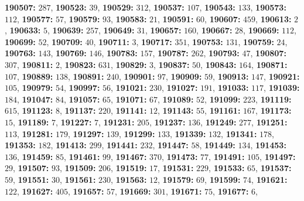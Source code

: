 \textsf{\bfseries 190507:} $287$, \textsf{\bfseries 190523:} $39$, \textsf{\bfseries 190529:} $312$, \textsf{\bfseries 190537:} $107$, \textsf{\bfseries 190543:} $133$, \textsf{\bfseries 190573:} $112$, \textsf{\bfseries 190577:} $57$, \textsf{\bfseries 190579:} $93$, \textsf{\bfseries 190583:} $21$, \textsf{\bfseries 190591:} $60$, \textsf{\bfseries 190607:} $459$, \textsf{\bfseries 190613:} $2$, \textsf{\bfseries 190633:} $5$, \textsf{\bfseries 190639:} $257$, \textsf{\bfseries 190649:} $31$, \textsf{\bfseries 190657:} $160$, \textsf{\bfseries 190667:} $28$, \textsf{\bfseries 190669:} $112$, \textsf{\bfseries 190699:} $52$, \textsf{\bfseries 190709:} $40$, \textsf{\bfseries 190711:} $3$, \textsf{\bfseries 190717:} $351$, \textsf{\bfseries 190753:} $131$, \textsf{\bfseries 190759:} $24$, \textsf{\bfseries 190763:} $143$, \textsf{\bfseries 190769:} $146$, \textsf{\bfseries 190783:} $157$, \textsf{\bfseries 190787:} $262$, \textsf{\bfseries 190793:} $47$, \textsf{\bfseries 190807:} $307$, \textsf{\bfseries 190811:} $2$, \textsf{\bfseries 190823:} $631$, \textsf{\bfseries 190829:} $3$, \textsf{\bfseries 190837:} $50$, \textsf{\bfseries 190843:} $164$, \textsf{\bfseries 190871:} $107$, \textsf{\bfseries 190889:} $138$, \textsf{\bfseries 190891:} $240$, \textsf{\bfseries 190901:} $97$, \textsf{\bfseries 190909:} $59$, \textsf{\bfseries 190913:} $147$, \textsf{\bfseries 190921:} $105$, \textsf{\bfseries 190979:} $54$, \textsf{\bfseries 190997:} $56$, \textsf{\bfseries 191021:} $230$, \textsf{\bfseries 191027:} $191$, \textsf{\bfseries 191033:} $117$, \textsf{\bfseries 191039:} $184$, \textsf{\bfseries 191047:} $84$, \textsf{\bfseries 191057:} $65$, \textsf{\bfseries 191071:} $67$, \textsf{\bfseries 191089:} $52$, \textsf{\bfseries 191099:} $223$, \textsf{\bfseries 191119:} $615$, \textsf{\bfseries 191123:} $8$, \textsf{\bfseries 191137:} $220$, \textsf{\bfseries 191141:} $12$, \textsf{\bfseries 191143:} $55$, \textsf{\bfseries 191161:} $167$, \textsf{\bfseries 191173:} $15$, \textsf{\bfseries 191189:} $7$, \textsf{\bfseries 191227:} $7$, \textsf{\bfseries 191231:} $205$, \textsf{\bfseries 191237:} $136$, \textsf{\bfseries 191249:} $277$, \textsf{\bfseries 191251:} $113$, \textsf{\bfseries 191281:} $179$, \textsf{\bfseries 191297:} $139$, \textsf{\bfseries 191299:} $133$, \textsf{\bfseries 191339:} $132$, \textsf{\bfseries 191341:} $178$, \textsf{\bfseries 191353:} $182$, \textsf{\bfseries 191413:} $299$, \textsf{\bfseries 191441:} $232$, \textsf{\bfseries 191447:} $58$, \textsf{\bfseries 191449:} $134$, \textsf{\bfseries 191453:} $136$, \textsf{\bfseries 191459:} $85$, \textsf{\bfseries 191461:} $99$, \textsf{\bfseries 191467:} $370$, \textsf{\bfseries 191473:} $77$, \textsf{\bfseries 191491:} $105$, \textsf{\bfseries 191497:} $29$, \textsf{\bfseries 191507:} $93$, \textsf{\bfseries 191509:} $206$, \textsf{\bfseries 191519:} $17$, \textsf{\bfseries 191531:} $229$, \textsf{\bfseries 191533:} $65$, \textsf{\bfseries 191537:} $59$, \textsf{\bfseries 191551:} $30$, \textsf{\bfseries 191561:} $230$, \textsf{\bfseries 191563:} $12$, \textsf{\bfseries 191579:} $69$, \textsf{\bfseries 191599:} $74$, \textsf{\bfseries 191621:} $122$, \textsf{\bfseries 191627:} $405$, \textsf{\bfseries 191657:} $57$, \textsf{\bfseries 191669:} $301$, \textsf{\bfseries 191671:} $75$, \textsf{\bfseries 191677:} $6$, 
